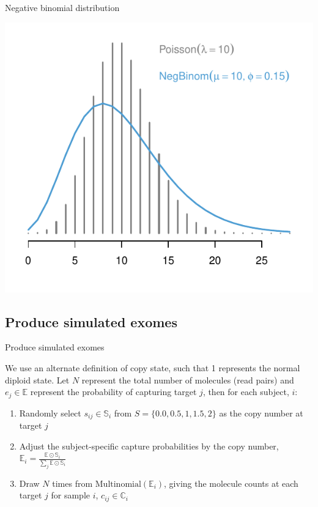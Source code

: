 \documentclass[
  10pt,
  ignorenonframetext,
  m]{beamer}
\begin{document}
\begin{frame}{Negative binomial distribution}
\protect\hypertarget{negative-binomial-distribution-1}{}

\begin{center}\includegraphics{defense_files/figure-beamer/nbPlt-1} \end{center}

\end{frame}

\hypertarget{produce-simulated-exomes}{%
\subsection{Produce simulated exomes}\label{produce-simulated-exomes}}

\begin{frame}{Produce simulated exomes}

\medskip

We use an alternate definition of copy state, such that 1 represents the
normal diploid state. Let \(N\) represent the total number of molecules
(read pairs) and \(e_j \in \mathbb{E}\) represent the probability of
capturing target \(j\), then for each subject, \(i\):

\begin{enumerate}
\item
  Randomly select \(s_{ij} \in \mathbb{S}_i\) from
  \(S = \{0.0, 0.5, 1, 1.5, 2\}\) as the copy number at target \(j\)
\item
  Adjust the subject-specific capture probabilities by the copy number,
  \(\mathbb{E}_i = \frac{\mathbb{E} \odot \mathbb{S}_{i}}{\sum_j \mathbb{E} \odot \mathbb{S}_{i}}\)
\item
  Draw \(N\) times from \(\text{Multinomial}(\mathbb{E}_i)\), giving the
  molecule counts at each target \(j\) for sample \(i\),
  \(c_{ij} \in \mathbb{C}_i\)
\end{enumerate}

\end{frame}
\end{document}
